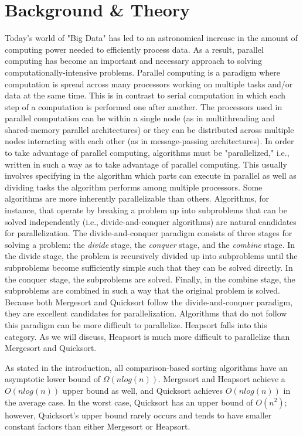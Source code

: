 \documentclass[conference]{IEEEtran}
\begin{document}
    \section{Background \& Theory}
    Today's world of "Big Data" has led to an astronomical increase in the amount of computing power needed to efficiently process data.
    As a result, parallel computing has become an important and necessary approach to solving computationally-intensive problems.
    Parallel computing is a paradigm where computation is spread across many processors working on multiple tasks and/or data at the same time. This is in contrast to serial computation in which each step of a computation is performed one after another.
    The processors used in parallel computation can be within a single node (as in multithreading and shared-memory parallel architectures) or they can be distributed across multiple nodes interacting with each other (as in message-passing architectures). In order to take advantage of parallel computing, algorithms must be "parallelized," i.e., written in such a way as to take advantage of parallel computing. This usually involves specifying in the algorithm which parts can execute in parallel as well as dividing tasks the algorithm performs among multiple processors. Some algorithms are more inherently parallelizable than others. Algorithms, for instance, that operate by breaking a problem up into subproblems that can be solved independently (i.e., divide-and-conquer algorithms) are natural candidates for parallelization. The divide-and-conquer paradigm consists of three stages for solving a problem: the \textit{divide} stage, the \textit{conquer} stage, and the \textit{combine} stage. In the divide stage, the problem is recursively divided up into subproblems until the subproblems become sufficiently simple such that they can be solved directly. In the conquer stage, the subproblems are solved. Finally, in the combine stage, the subproblems are combined in such a way that the original problem is solved. Because both Mergesort and Quicksort follow the divide-and-conquer paradigm, they are excellent candidates for parallelization. Algorithms that do not follow this paradigm can be more difficult to parallelize. Heapsort falls into this category. As we will discuss, Heapsort is much more difficult to parallelize than Mergesort and Quicksort.
    
    As stated in the introduction, all comparison-based sorting algorithms have an asymptotic lower bound of $\Omega(nlog(n))$. 
    Mergesort and Heapsort achieve a $O(nlog(n))$ upper bound as well, and Quicksort achieves $O(nlog(n))$ in the average case. In the worst case, Quicksort has an upper bound of $O(n^2)$; 
    however, Quicksort's upper bound rarely occurs and tends to have smaller constant factors than either Mergesort or Heapsort. \cite{hoare_algorithm_1961} %
    
\end{document}

